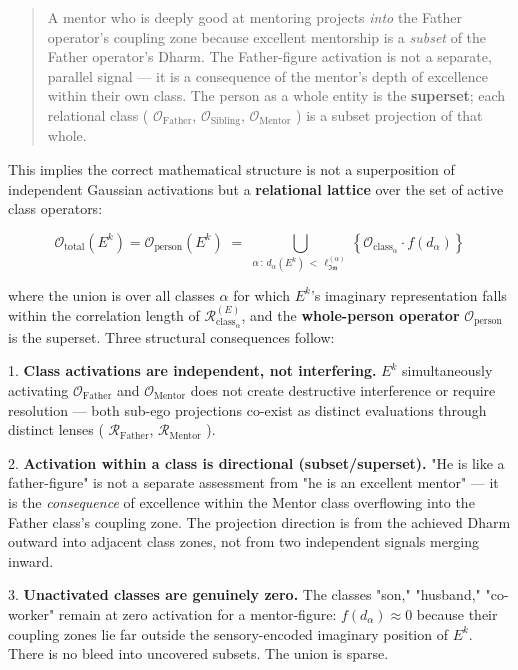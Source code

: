 \documentclass[11pt,a4paper]{article}
\theoremstyle{definition}
\theoremstyle{remark}
\begin{document}
\begin{quote}A mentor who is deeply good at mentoring projects \textit{into} the Father operator's coupling zone because excellent mentorship is a \textit{subset} of the Father operator's Dharm. The Father-figure activation is not a separate, parallel signal — it is a consequence of the mentor's depth of excellence within their own class. The person as a whole entity is the \textbf{superset}; each relational class ( $\mathcal{O}_{\text{Father}}$, $\mathcal{O}_{\text{Sibling}}$, $\mathcal{O}_{\text{Mentor}}$ ) is a subset projection of that whole.\end{quote}

This implies the correct mathematical structure is not a superposition of independent Gaussian activations but a \textbf{relational lattice} over the set of active class operators:


\begin{equation}
\boxed{\mathcal{O}_{\text{total}}(E^k) = \mathcal{O}_{\text{person}}(E^k) \;=\; \bigcup_{\alpha \,:\, d_\alpha(E^k) \,<\, \ell_{\mathfrak{Im}}^{(\alpha)}} \left\{ \mathcal{O}_{\text{class}_\alpha} \cdot f\!\left(d_\alpha\right) \right\}}
\end{equation}


where the union is over all classes $\alpha$ for which $E^k$'s imaginary representation falls within the correlation length of $\mathcal{R}_{\text{class}_\alpha}^{(E)}$, and the \textbf{whole-person operator} $\mathcal{O}_{\text{person}}$ is the superset. Three structural consequences follow:

1. \textbf{Class activations are independent, not interfering.} $E^k$ simultaneously activating $\mathcal{O}_{\text{Father}}$ and $\mathcal{O}_{\text{Mentor}}$ does not create destructive interference or require resolution — both sub-ego projections co-exist as distinct evaluations through distinct lenses ( $\mathcal{R}_{\text{Father}}$, $\mathcal{R}_{\text{Mentor}}$ ).

2. \textbf{Activation within a class is directional (subset/superset).} "He is like a father-figure" is not a separate assessment from "he is an excellent mentor" — it is the \textit{consequence} of excellence within the Mentor class overflowing into the Father class's coupling zone. The projection direction is from the achieved Dharm outward into adjacent class zones, not from two independent signals merging inward.

3. \textbf{Unactivated classes are genuinely zero.} The classes "son," "husband," "co-worker" remain at zero activation for a mentor-figure: $f(d_\alpha) \approx 0$ because their coupling zones lie far outside the sensory-encoded imaginary position of $E^k$. There is no bleed into uncovered subsets. The union is sparse.
\end{document}
